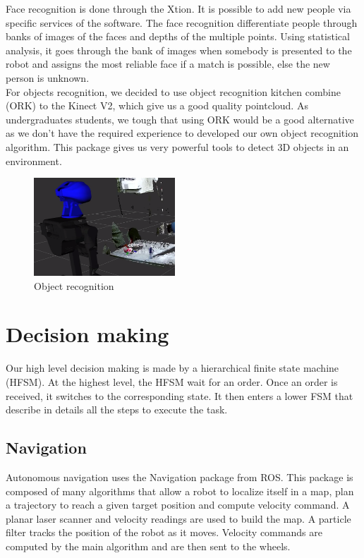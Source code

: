 \documentclass[runningheads,a4paper]{llncs}
\begin{document}
Face recognition is done through the Xtion. It is possible to add new people via specific services of the software. The face recognition differentiate people through banks of images of the faces and depths of the multiple points. Using statistical analysis, it goes through the bank of images when somebody is presented to the robot and assigns the most reliable face if a match is
possible, else the new person is unknown. \\

For objects recognition, we decided to use object recognition kitchen combine (ORK) to the Kinect V2, which give us a good quality pointcloud. As undergraduates students, we tough that using ORK would be a good alternative as we don't have the required experience to developed our own object recognition algorithm. This package gives us very powerful tools to detect 3D objects in an environment. \\

\begin{figure}
  \centering
  \includegraphics[width=150pt]{images/objectreco.png}
  \caption{Object recognition}
\end{figure}

\newpage
\section{Decision making}
\tab Our high level decision making is made by a hierarchical finite state machine (HFSM). At the highest level, the HFSM wait for an order. Once an order is received, it switches to the corresponding state. It then enters a lower FSM that describe in details all the steps to execute the task. 

\subsection{Navigation}
\tab Autonomous navigation uses the Navigation package from ROS. This package is composed of many algorithms that allow a robot to localize itself in a map, plan a trajectory to reach a given target position and compute velocity command. A planar laser scanner and velocity readings are used to build the map. A particle filter tracks the position of the robot as it moves. Velocity commands are computed by the main algorithm and are then sent to the wheels. 
\end{document}
